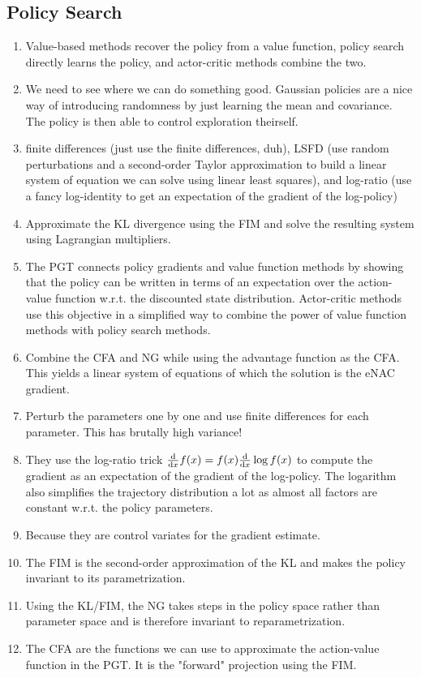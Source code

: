 		\subsection{Policy Search}
			\begin{enumerate}
				\item Value-based methods recover the policy from a value function, policy search directly learns the policy, and actor-critic methods combine the two.
				\item We need to see where we can do something good. Gaussian policies are a nice way of introducing randomness by just learning the mean and covariance. The policy is then able to control exploration theirself.
				\item finite differences (just use the finite differences, duh), \acl{LSFD} (use random perturbations and a second-order Taylor approximation to build a linear system of equation we can solve using linear least squares), and log-ratio (use a fancy log-identity to get an expectation of the gradient of the log-policy)
				\item Approximate the \ac{KL} divergence using the \ac{FIM} and solve the resulting system using Lagrangian multipliers.
				\item The \ac{PGT} connects policy gradients and value function methods by showing that the policy can be written in terms of an expectation over the action-value function w.r.t. the discounted state distribution. Actor-critic methods use this objective in a simplified way to combine the power of value function methods with policy search methods.
				\item Combine the \ac{CFA} and \ac{NG} while using the advantage function as the \ac{CFA}. This yields a linear system of equations of which the solution is the \ac{eNAC} gradient.
				\item Perturb the parameters one by one and use finite differences for each parameter. This has brutally high variance!
				\item They use the log-ratio trick \( \dv{x} f(x) = f(x) \dv{x} \log f(x) \) to compute the gradient as an expectation of the gradient of the log-policy. The logarithm also simplifies the trajectory distribution a lot as almost all factors are constant w.r.t. the policy parameters.
				\item Because they are control variates for the gradient estimate.  %
				\item The \ac{FIM} is the second-order approximation of the \ac{KL} and makes the policy invariant to its parametrization.
				\item Using the \ac{KL}/\ac{FIM}, the \ac{NG} takes steps in the policy space rather than parameter space and is therefore invariant to reparametrization.
				\item The \ac{CFA} are the functions we can use to approximate the action-value function in the \ac{PGT}. It is the "forward" projection using the \ac{FIM}.
			\end{enumerate}

